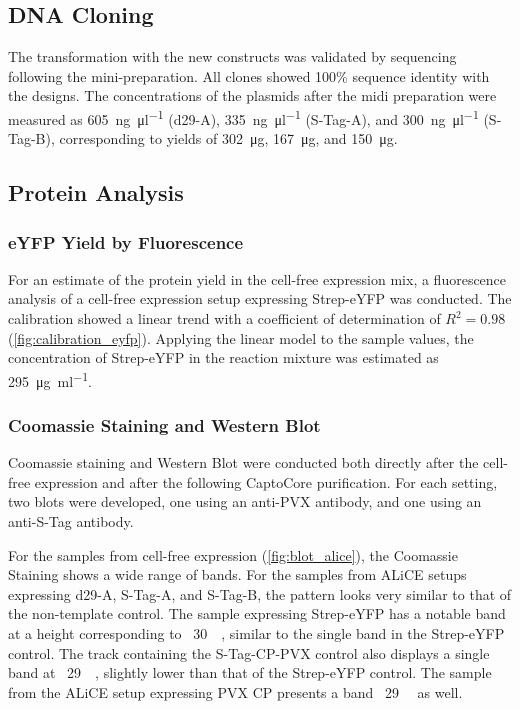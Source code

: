 \subsection{DNA Cloning}
The transformation with the new constructs was validated by sequencing following the mini-preparation. All clones showed 100\% sequence identity with the designs. The concentrations of the plasmids after the midi preparation were measured as \SI{605}{\nano\gram\per\micro\litre} (d29-A), \SI{335}{\nano\gram\per\micro\litre} (S-Tag-A), and \SI{300}{\nano\gram\per\micro\litre} (S-Tag-B), corresponding to yields of \SI{302}{\micro\gram}, \SI{167}{\micro\gram}, and \SI{150}{\micro\gram}.

\subsection{Protein Analysis}
\subsubsection{eYFP Yield by Fluorescence}
For an estimate of the protein yield in the cell-free expression mix, a fluorescence analysis of a cell-free expression setup expressing Strep-eYFP was conducted. The calibration showed a linear trend with a coefficient of determination of $R^2 = 0.98$ (\autoref{fig:calibration_eyfp}). Applying the linear model to the sample values, the concentration of Strep-eYFP in the reaction mixture was estimated as \SI{295}{\micro\gram\per\milli\litre}.

\subsubsection{Coomassie Staining and Western Blot} 
Coomassie staining and Western Blot were conducted both directly after the cell-free expression and after the following CaptoCore purification. For each setting, two blots were developed, one using an anti-PVX antibody, and one using an anti-S-Tag antibody. 

For the samples from cell-free expression (\autoref{fig:blot_alice}), the Coomassie Staining shows a wide range of bands. For the samples from ALiCE setups expressing d29-A, S-Tag-A, and S-Tag-B, the pattern looks very similar to that of the non-template control. The sample expressing Strep-eYFP has a notable band at a height corresponding to ~\SI{30}{\kilo\Dalton}, similar to the single band in the Strep-eYFP control. The track containing the S-Tag-CP-PVX control also displays a single band at ~\SI{29}{\kilo\Dalton}, slightly lower than that of the Strep-eYFP control. The sample from the ALiCE setup expressing PVX CP presents a band ~\SI{29}{\kilo\Dalton} as well. 

